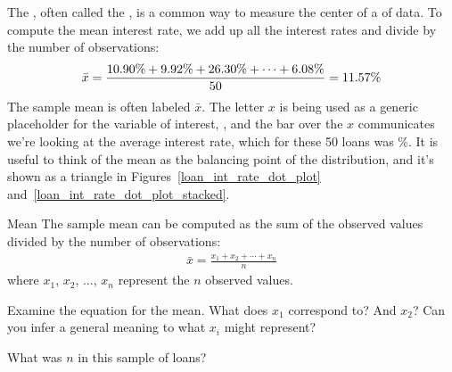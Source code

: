 The , often called the
, is a common way
to measure the center of a \mbox{} of data.
To compute the mean interest rate, we add up all the interest
rates and divide by the number of observations:
\begin{align*}
\bar{x}
    = \frac{\text{10.90\%} + \text{9.92\%} + \text{26.30\%} +
        \cdots + \text{6.08\%}}{50{}}
    = 11.57{}\%
\end{align*}
The sample mean is often labeled $\bar{x}$.
The letter $x$ is being used as a generic placeholder
for the variable of interest, ,
and the bar over the $x$ communicates we're looking at the
average interest rate, which for these 50 loans was \loanAvg{}\%.
It is useful to think of the mean as the balancing point
of the distribution, and it's shown as a triangle in Figures~\ref{loan_int_rate_dot_plot}
and~\ref{loan_int_rate_dot_plot_stacked}.

\begin{onebox}{Mean}%
The sample mean can be computed as the sum of the
observed values divided by the number of observations:
\begin{align*}
\bar{x} = \frac{x_1 + x_2 + \cdots + x_n}{n}
\end{align*}
where $x_1$, $x_2$, $\dots$, $x_n$ represent
the $n$ observed values.
\end{onebox}

\begin{exercisewrap}
\begin{nexercise}
Examine the equation for the mean.
What does $x_1$ correspond to? And $x_2$?
Can you infer a general meaning to what $x_i$
might represent?\footnotemark{}
\end{nexercise}
\end{exercisewrap}

\begin{exercisewrap}
\begin{nexercise}
What was $n$ in this sample of
loans?\footnotemark{}
\end{nexercise}
\end{exercisewrap}

